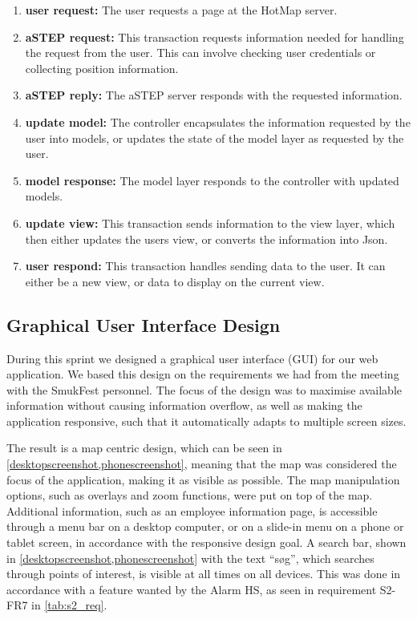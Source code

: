 \begin{enumerate}
    \item \textbf{user request:} The user requests a page at the HotMap server.
    \item \textbf{aSTEP request:} This transaction requests information needed for handling the request from the user. This can involve checking user credentials or collecting position information.
    \item \textbf{aSTEP reply:} The aSTEP server responds with the requested information.
    \item \textbf{update model:} The controller encapsulates the information requested by the user into models, or updates the state of the model layer as requested by the user.
    \item \textbf{model response:} The model layer responds to the controller with updated models.
    \item \textbf{update view:} This transaction sends information to the view layer, which then either updates the users view, or converts the information into Json.
    \item \textbf{user respond:} This transaction handles sending data to the user. It can either be a new view, or data to display on the current view.
\end{enumerate}

\subsection{Graphical User Interface Design} \label{sec:s2_gui}

During this sprint we designed a graphical user interface (GUI) for our web application. We based this design on the requirements we had from the meeting with the SmukFest personnel. The focus of the design was to maximise available information without causing information overflow, as well as making the application responsive, such that it automatically adapts to multiple screen sizes. 

The result is a map centric design, which can be seen in \cref{desktopscreenshot,phonescreenshot}, meaning that the map was considered the focus of the application, making it as visible as possible. The map manipulation options, such as overlays and zoom functions, were put on top of the map. Additional information, such as an employee information page, is accessible through a menu bar on a desktop computer, or on a slide-in menu on a phone or tablet screen, in accordance with the responsive design goal. A search bar, shown in \cref{desktopscreenshot,phonescreenshot} with the text \enquote{søg}, which searches through points of interest, is visible at all times on all devices. This was done in accordance with a feature wanted by the Alarm HS, as seen in requirement S2-FR7 in \cref{tab:s2_req}.


